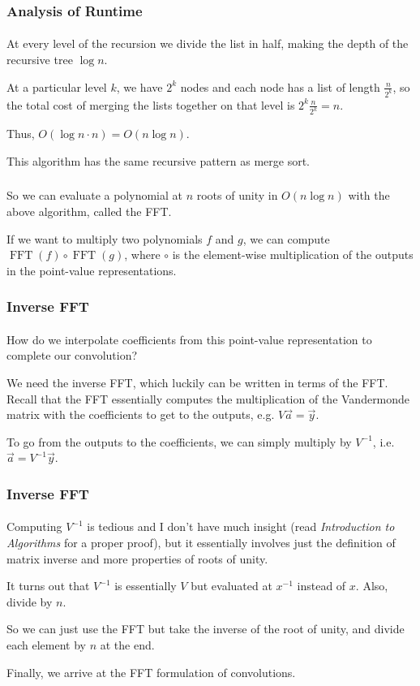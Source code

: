 \documentclass{beamer}                             %
\DeclareMathOperator{\FFT}{FFT}
\begin{document}
\begin{frame}
\frametitle{Analysis of Runtime}
\framesubtitle{}
At every level of the recursion we divide the list in half,
making the depth of the recursive tree \( \log n \). \pause

At a particular level \( k \), we have \( 2^k \) nodes and
each node has a list of length \( \frac{n}{2^k} \), so the total cost of
merging the lists together on that level is \( 2^k \frac{n}{2^k} = n \). \pause

Thus, \( O(\log n \cdot n) = O(n \log n) \).

This algorithm has the same recursive pattern as merge sort.
\end{frame}

\begin{frame}
\frametitle{}
\framesubtitle{}
So we can evaluate a polynomial at \( n \) roots of unity in \( O(n \log n) \)
with the above algorithm, called the \alert{FFT}. \pause

If we want to multiply two polynomials \( f \) and \( g \), we can compute
\( \FFT(f) \circ \FFT(g) \), where \( \circ \) is the element-wise multiplication
of the outputs in the point-value representations.
\end{frame}

\begin{frame}
\frametitle{Inverse FFT}
\framesubtitle{}
How do we interpolate coefficients from this point-value representation to
complete our convolution? \pause

We need the inverse FFT, which luckily can be written
in terms of the FFT. Recall that the FFT essentially computes the 
multiplication of the Vandermonde matrix with the coefficients to get to the
outputs, e.g. \( V \vec{a} = \vec{y} \). \pause

To go from the outputs to the coefficients, we can simply multiply
by \( V^{-1} \), i.e. \( \vec{a} = V^{-1} \vec{y} \).
\end{frame}

\begin{frame}
\frametitle{Inverse FFT}
\framesubtitle{}
Computing \( V^{-1} \) is tedious and I don't
have much insight (read \textit{Introduction to Algorithms} for a proper proof),
but it essentially involves just the definition of matrix inverse and more
properties of roots of unity. \pause 

It turns out that \( V^{-1} \) is essentially \( V \) but evaluated
at \( x^{-1} \) instead of \( x \). Also, divide by \( n \). \pause 

So we can just use the FFT but take the inverse of the root of unity,
and divide each element by \( n \) at the end. \pause

Finally, we arrive at the FFT formulation of convolutions.
\end{frame}
\end{document}
